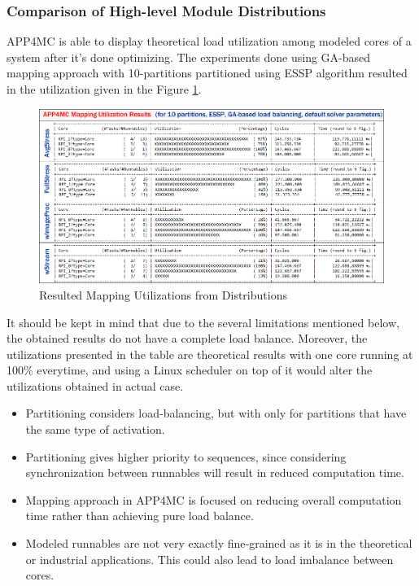 \partitioningHLDistrFullStress


\subsubsection{Comparison of High-level Module Distributions}
APP4MC is able to display theoretical load utilization among modeled cores of a system after it's done optimizing. The experiments done using GA-based mapping approach with 10-partitions partitioned using ESSP algorithm resulted in the utilization given in the Figure \ref{fig:mappingutil}. %

\begin{figure}[!ht]
	\centering
	\captionsetup{justification=centering}
	\includegraphics[width=\textwidth]{content/images/mappingutil.png}
	\caption{Resulted Mapping Utilizations from Distributions}
	\label{fig:mappingutil}
\end{figure}

It should be kept in mind that due to the several limitations mentioned below, the obtained results do not have a complete load balance. Moreover, the utilizations presented in the table are theoretical results with one core running at 100\% everytime, and using a Linux scheduler on top of it would alter the utilizations obtained in actual case.

\begin{itemize}
	\item Partitioning considers load-balancing, but with only for partitions that have the same type of activation.
	\item Partitioning gives higher priority to sequences, since considering synchronization between runnables will result in reduced computation time.
	\item Mapping approach in APP4MC is focused on reducing overall computation time rather than achieving pure load balance.
	\item Modeled runnables are not very exactly fine-grained as it is in the theoretical or industrial applications. This could also lead to load imbalance between cores.
\end{itemize}

